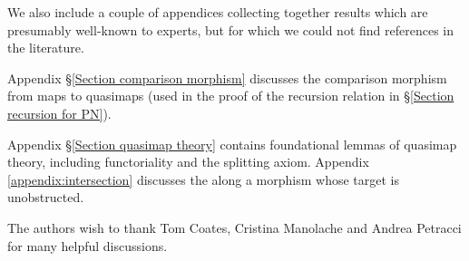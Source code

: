 We also include a couple of appendices collecting together results which are presumably well-known to experts, but for which we could not find references in the literature.

Appendix \S \ref{Section comparison morphism} discusses the comparison morphism from maps to quasimaps (used in the proof of the recursion relation in \S \ref{Section recursion for PN}).

Appendix \S \ref{Section quasimap theory} contains foundational lemmas of quasimap theory, including functoriality and the splitting axiom. Appendix \ref{appendix:intersection} discusses the  along a morphism whose target is unobstructed.

\begin{acknowledgements} The authors wish to thank Tom Coates, Cristina Manolache and Andrea Petracci for many helpful discussions.
\end{acknowledgements}

